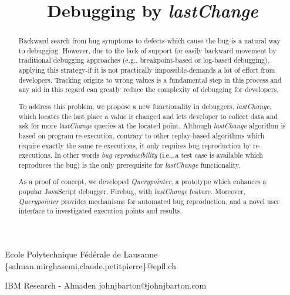 \documentclass[preprint]{sigplanconf}
\begin{document}
\copyrightdata{[to be supplied]} 

\preprintfooter{}   %

\title{Debugging by \textit{lastChange}}
\subtitle{}

           {Ecole Polytechnique F\'ed\'erale de Lausanne}
           {\{salman.mirghasemi,claude.petitpierre\}@epfl.ch}

           {IBM Research - Almaden}
           {johnjbarton@johnjbarton.com}

\maketitle

\begin{abstract}
Backward search from bug symptoms to defects-which cause the bug-is a natural way to debugging. However, due to the lack of support for easily backward movement by  traditional debugging approaches (e.g., breakpoint-based or log-based debugging), applying this strategy-if it is not practically impossible-demands a lot of effort from developers. Tracking origins to wrong values is a fundamental step in this process and any aid in this regard can greatly reduce the complexity of debugging for developers.

To address this problem, we propose a new functionality in debuggers, \textit{lastChange}, which locates the last place a value is changed and lets developer to collect data and ask for more \textit{lastChange} queries at the located point. Although \textit{lastChange} algorithm is based on program re-execution, contrary to other replay-based algorithms which require exactly the same re-executions, it only requires bug reproduction by re-executions. In other words \textit{bug reproducibility} (i.e., a test case is available which reproduces the bug) is the only prerequisite for \textit{lastChange} functionality.

As a proof of concept, we developed \textit{Querypointer}, a prototype which enhances a popular JavaScript debugger, Firebug, with \textit{lastChange} feature. Moreover, \textit{Querypointer} provides mechanisms for automated bug reproduction, and a novel user interface to investigated execution points and results.

\end{abstract}
\end{document}
